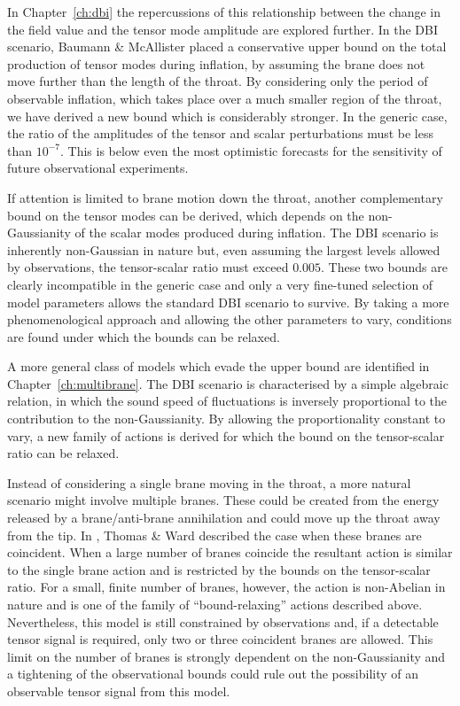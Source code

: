 In Chapter~\ref{ch:dbi} the repercussions of this relationship between the change in
the field value and the tensor mode amplitude are explored further. In the DBI
scenario,
Baumann \& McAllister \cite{bmpaper} placed a conservative
upper bound on the total production of tensor modes during inflation, by assuming the
brane does not move further than the length of the throat. By considering only the
period of observable inflation, which takes place over a much smaller region of the
throat, we have derived a new bound which is considerably stronger. In the
generic
case, the ratio of the amplitudes of the tensor and scalar perturbations must be less
than
$10^{-7}$. This is below  even the most optimistic forecasts for
the sensitivity of future observational experiments. 

If attention is limited to brane motion down the throat, another complementary bound
on the tensor modes can be derived, which depends on the non-Gaussianity of the
scalar modes produced
during inflation. The DBI scenario is inherently non-Gaussian in nature but, even
assuming the largest levels allowed by observations, the tensor-scalar ratio must
exceed $0.005$. These two bounds are clearly incompatible in the generic
case and only a very fine-tuned selection of model parameters allows the standard DBI
scenario to survive. By taking a more phenomenological approach and allowing the
other parameters to vary,
conditions are found under which the bounds can be relaxed.


A more general class of models which evade the upper bound are identified in
Chapter~\ref{ch:multibrane}. The DBI scenario is characterised by a simple
algebraic relation, in which the sound speed of fluctuations is inversely
proportional to the contribution to the non-Gaussianity. By allowing the
proportionality constant to vary, a new family of actions is derived for which the
bound on the tensor-scalar ratio can be relaxed. 

Instead of considering a single brane moving in the throat, a more natural scenario
might involve multiple branes. These could be created from the energy released by a
brane/anti-brane annihilation and could move up the throat away from the tip.
In , Thomas \& Ward described the case when these branes are
coincident. When a large number of branes coincide the resultant action is similar
to the single brane action and is restricted by the bounds on the tensor-scalar
ratio. For a small, finite number of branes, however, the action is non-Abelian in
nature and is one of the family of ``bound-relaxing'' actions described above.
Nevertheless, this model is still constrained by observations and, if a detectable
tensor signal is required, only two or three coincident branes
are allowed. This limit on the number of branes is strongly dependent on the
non-Gaussianity and a tightening of the observational bounds could rule out the
possibility of an observable tensor signal from this model.


